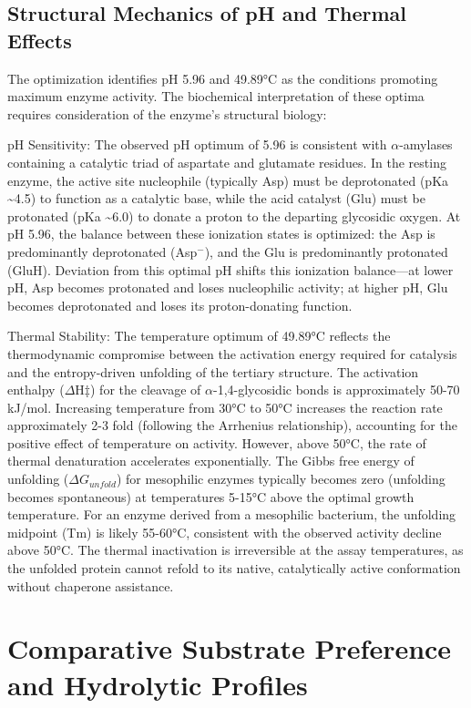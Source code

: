 \documentclass[
  12pt,
]{article}
\begin{document}
\subsection{Structural Mechanics of pH and Thermal
Effects}\label{structural-mechanics-of-ph-and-thermal-effects}

The optimization identifies pH 5.96 and 49.89°C as the conditions
promoting maximum enzyme activity. The biochemical interpretation of
these optima requires consideration of the enzyme's structural biology:

pH Sensitivity: The observed pH optimum of 5.96 is consistent with
\(\alpha\)-amylases containing a catalytic triad of aspartate and
glutamate residues. In the resting enzyme, the active site nucleophile
(typically Asp) must be deprotonated (pKa \textasciitilde4.5) to
function as a catalytic base, while the acid catalyst (Glu) must be
protonated (pKa \textasciitilde6.0) to donate a proton to the departing
glycosidic oxygen. At pH 5.96, the balance between these ionization
states is optimized: the Asp is predominantly deprotonated (Asp\(^-\)),
and the Glu is predominantly protonated (GluH). Deviation from this
optimal pH shifts this ionization balance---at lower pH, Asp becomes
protonated and loses nucleophilic activity; at higher pH, Glu becomes
deprotonated and loses its proton-donating function.

Thermal Stability: The temperature optimum of 49.89°C reflects the
thermodynamic compromise between the activation energy required for
catalysis and the entropy-driven unfolding of the tertiary structure.
The activation enthalpy (\(\Delta\)H‡) for the cleavage of
\(\alpha\)-1,4-glycosidic bonds is approximately 50-70 kJ/mol.
Increasing temperature from 30°C to 50°C increases the reaction rate
approximately 2-3 fold (following the Arrhenius relationship),
accounting for the positive effect of temperature on activity. However,
above 50°C, the rate of thermal denaturation accelerates exponentially.
The Gibbs free energy of unfolding (\(\Delta G_{unfold}\)) for
mesophilic enzymes typically becomes zero (unfolding becomes
spontaneous) at temperatures 5-15°C above the optimal growth
temperature. For an enzyme derived from a mesophilic bacterium, the
unfolding midpoint (Tm) is likely 55-60°C, consistent with the observed
activity decline above 50°C. The thermal inactivation is irreversible at
the assay temperatures, as the unfolded protein cannot refold to its
native, catalytically active conformation without chaperone assistance.

\section{Comparative Substrate Preference and Hydrolytic
Profiles}\label{comparative-substrate-preference-and-hydrolytic-profiles}
\end{document}
